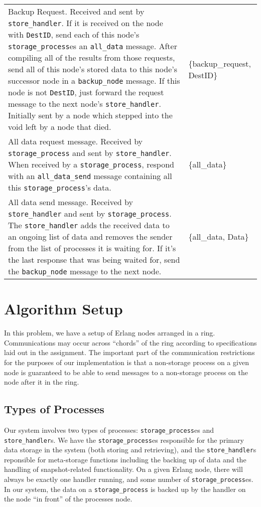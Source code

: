 \documentclass[12pt,letterpaper]{article}
\renewcommand{\tt}[1]{\texttt{#1}}
\newcommand{\sh}{\tt{store\_handler}}
\renewcommand{\sp}{\tt{storage\_process}}
\begin{document}
\begin{longtable}{p{4.5in}T}
Backup Request.  Received and sent by \sh.  If it is received on the node with \tt{DestID}, send each of this node's \sp es an \tt{all\_data} message.  After compiling all of the results from those requests, send all of this node's stored data to this node's successor node in a \tt{backup\_node} message.  If this node is not \tt{DestID}, just forward the request message to the next node's \sh. Initially sent by a node which stepped into the void left by a node that died.  & 
\{backup\_request, DestID\} \\

All data request message.  Received by \sp{} and sent by \sh.  When received by a \sp, respond with an \tt{all\_data\_send} message containing all this \sp's data.  & 
\{all\_data\} \\

All data send message.  Received by \sh{} and sent by \sp.  The \sh{} adds the received data to an ongoing list of data and removes the sender from the list of processes it is waiting for. If it's the last response that was being waited for, send the \tt{backup\_node} message to the next node. & 
\{all\_data, Data\}

\end{longtable}

\clearpage
\onehalfspacing

\section*{Algorithm Setup}

In this problem, we have a setup of Erlang nodes arranged in a ring.  Communications may occur across ``chords'' of the ring according to specifications laid out in the assignment.  The important part of the communication restrictions for the purposes of our implementation is that a non-storage process on a given node is guaranteed to be able to send messages to a non-storage process on the node after it in the ring.

\subsection*{Types of Processes}

Our system involves two types of processes: \sp es and \sh s. We have the \sp es responsible for the primary data storage in the system (both storing and retrieving), and the \sh s reponsible for meta-storage functions including the backing up of data and the handling of snapshot-related functionality. On a given Erlang node, there will always be exactly one handler running, and some number of \sp es. In our system, the data on a \sp{} is backed up by the handler on the node ``in front'' of the processes node.
\end{document}
